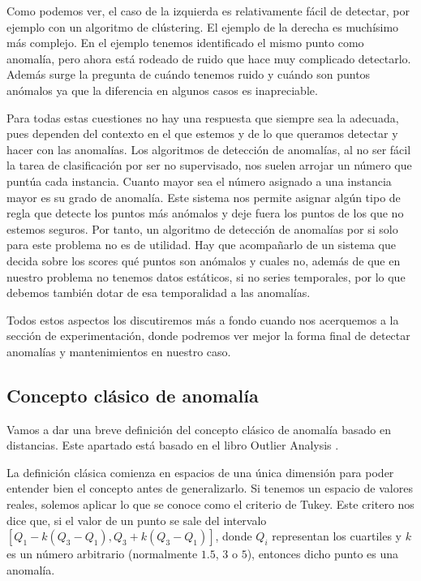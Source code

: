 Como podemos ver, el caso de la izquierda es relativamente fácil de detectar, por ejemplo con un algoritmo de clústering. El ejemplo de la derecha es muchísimo más complejo. En el ejemplo tenemos identificado el mismo punto como anomalía, pero ahora está rodeado de ruido que hace muy complicado detectarlo. Además surge la pregunta de cuándo tenemos ruido y cuándo son puntos anómalos ya que la diferencia en algunos casos es inapreciable.

Para todas estas cuestiones no hay una respuesta que siempre sea la adecuada, pues dependen del contexto en el que estemos y de lo que queramos detectar y hacer con las anomalías. Los algoritmos de detección de anomalías, al no ser fácil la tarea de clasificación por ser no supervisado, nos suelen arrojar un número que puntúa cada instancia. Cuanto mayor sea el número asignado a una instancia mayor es su grado de anomalía. Este sistema nos permite asignar algún tipo de regla que detecte los puntos más anómalos y deje fuera los puntos de los que no estemos seguros. Por tanto, un algoritmo de detección de anomalías por si solo para este problema no es de utilidad. Hay que acompañarlo de un sistema que decida sobre los scores qué puntos son anómalos y cuales no, además de que en nuestro problema no tenemos datos estáticos, si no series temporales, por lo que debemos también dotar de esa temporalidad a las anomalías.

Todos estos aspectos los discutiremos más a fondo cuando nos acerquemos a la sección de experimentación, donde podremos ver mejor la forma final de detectar anomalías y mantenimientos en nuestro caso.

\subsection{Concepto clásico de anomalía}

Vamos a dar una breve definición del concepto clásico de anomalía basado en distancias. Este apartado está basado en el libro Outlier Analysis \cite{aggarwal_outlier_2017}.

La definición clásica comienza en espacios de una única dimensión para poder entender bien el concepto antes de generalizarlo. Si tenemos un espacio de valores reales, solemos aplicar lo que se conoce como el criterio de Tukey. Este critero nos dice que, si el valor de un punto se sale del intervalo $[Q_1 - k(Q_3 - Q_1), Q_3 + k(Q_3 - Q_1)]$, donde $Q_i$ representan los cuartiles y $k$ es un número arbitrario (normalmente $1.5$, $3$ o $5$), entonces dicho punto es una anomalía.

